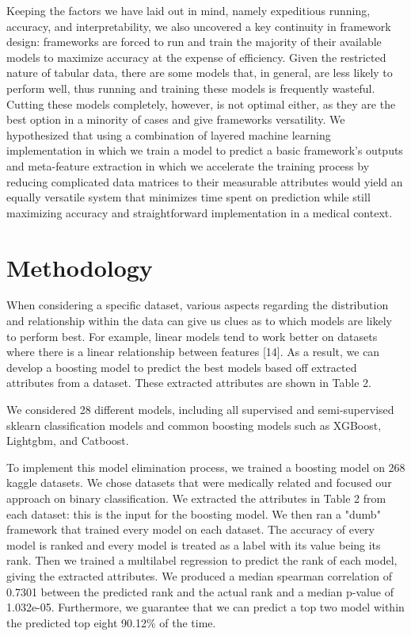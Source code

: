 \documentclass{article}
\begin{document}
Keeping the factors we have laid out in mind, namely expeditious running, accuracy, and interpretability, we also uncovered a key continuity in framework design: frameworks are forced to run and train the majority of their available models to maximize accuracy at the expense of efficiency. Given the restricted nature of tabular data, there are some models that, in general, are less likely to perform well, thus running and training these models is frequently wasteful. Cutting these models completely, however, is not optimal either, as they are the best option in a minority of cases and give frameworks versatility. We hypothesized that using a combination of layered machine learning implementation in which we train a model to predict a basic framework's outputs and meta-feature extraction in which we accelerate the training process by reducing complicated data matrices to their measurable attributes would yield an equally versatile system that minimizes time spent on prediction while still maximizing accuracy and straightforward implementation in a medical context. 

\section{Methodology}
When considering a specific dataset, various aspects regarding the distribution and relationship within the data can give us clues as to which models are likely to perform best. For example, linear models tend to work better on datasets where there is a linear relationship between features [14]. As a result, we can develop a boosting model to predict the best models based off extracted attributes from a dataset. These extracted attributes are shown in Table 2. 

We considered 28 different models, including all supervised and semi-supervised sklearn classification models and common boosting models such as XGBoost, Lightgbm, and Catboost.

To implement this model elimination process, we trained a boosting model on 268 kaggle datasets. We chose datasets that were medically related and focused our approach on binary classification. We extracted the attributes in Table 2 from each dataset: this is the input for the boosting model. We then ran a "dumb" framework that trained every model on each dataset. The accuracy of every model is ranked and every model is treated as a label with its value being its rank. Then we trained a multilabel regression to predict the rank of each model, giving the extracted attributes. We produced a median spearman correlation of 0.7301 between the predicted rank and the actual rank and a median p-value of 1.032e-05. Furthermore, we guarantee that we can predict a top two model within the predicted top eight 90.12\% of the time.
\end{document}
